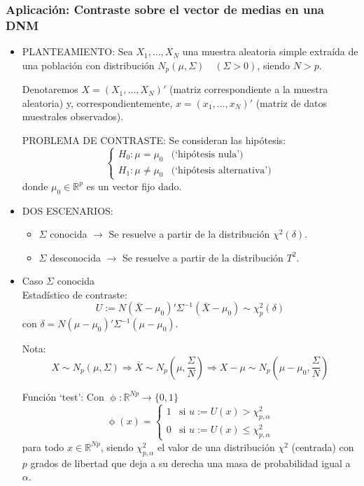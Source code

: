 \documentclass[11pt,a4paper]{article}
\begin{document}
\subsubsection{Aplicación: Contraste sobre el vector de medias en una DNM}
\begin{itemize}
\item PLANTEAMIENTO: Sea $X_{1}, \dots, X_{N}$ una muestra aleatoria simple extraída de una población con distribución $N_{p}(\mu, \Sigma) \quad (\Sigma > 0)$, siendo $N > p$.

Denotaremos $X = (X_{1}, \dots, X_{N})'$ (matriz correspondiente a la muestra aleatoria) y, correspondientemente, $x = (x_{1}, \dots, x_{N})'$ (matriz de datos muestrales observados).

PROBLEMA DE CONTRASTE: Se consideran las hipótesis:
$$\begin{cases}
H_{0}: \mu = \mu_{0} & \text{(`hipótesis nula')} \\
H_{1}: \mu \neq \mu_{0} & \text{(`hipótesis alternativa')}
\end{cases}$$
donde $\mu_{0} \in \mathbb{R}^{p}$ es un vector fijo dado.

\item DOS ESCENARIOS:
\begin{itemize}
\item $\Sigma$ conocida $\to$ Se resuelve a partir de la distribución $\chi^{2}(\delta)$.
\item $\Sigma$ desconocida $\to$ Se resuelve a partir de la distribución $T^{2}$.
\end{itemize}

\item Caso $\Sigma$ conocida \\
Estadístico de contraste:
$$U := N(\bar{X}-\mu_{0})'\Sigma^{-1}(\bar{X}-\mu_{0}) \sim \chi_{p}^{2}(\delta)$$
con $\delta=N(\mu-\mu_{0})'\Sigma^{-1}(\mu-\mu_{0})$.

Nota:
$$X \sim N_{p}(\mu, \Sigma) \Rightarrow \bar{X} \sim N_{p}(\mu, \frac{\Sigma}{N}) \Rightarrow X-\mu \sim N_{p}(\mu - \mu_{0}, \frac{\Sigma}{N})$$

Función `test': Con $\upphi: \mathbb{R}^{Np} \to \{0, 1\}$
$$\upphi(x) = \begin{cases}
1 & \text{si } u := U(x) > \chi_{p, \alpha}^{2} \\
0 & \text{si } u := U(x) \leq \chi_{p, \alpha}^{2}
\end{cases}$$
para todo $x \in \mathbb{R}^{Np}$, siendo $\chi_{p, \alpha}^{2}$ el valor de una distribución $\chi^{2}$ (centrada) con $p$ grados de libertad que deja a su derecha una masa de probabilidad igual a $\alpha$.


\end{itemize}
\end{document}
